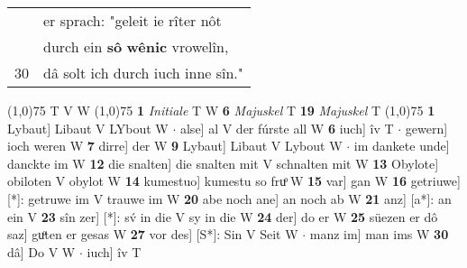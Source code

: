 \documentclass[8pt,a4paper,notitlepage]{article}
\begin{document}
\begin{table}[ht]
\begin{minipage}[t]{0.5\linewidth}
\begin{tabular}{rl}
 & er sprach: "geleit ie rîter nôt\\ 
 & durch ein \textbf{sô} \textbf{wênic} vrowelîn,\\ 
30 & dâ solt ich durch iuch inne sîn."\\ 
\end{tabular}
\scriptsize
\line(1,0){75} \newline
T V W \newline
\line(1,0){75} \newline
\textbf{1} \textit{Initiale} T W  \textbf{6} \textit{Majuskel} T  \textbf{19} \textit{Majuskel} T  \newline
\line(1,0){75} \newline
\textbf{1} Lybaut] Libaut V LYbout W  $\cdot$ alse] al V der fúrste all W \textbf{6} iuch] îv T  $\cdot$ gewern] ioch weren W \textbf{7} dirre] der W \textbf{9} Lybaut] Libaut V Lybout W  $\cdot$ im dankete unde] danckte im W \textbf{12} die snalten] die snalten mit V schnalten mit W \textbf{13} Obylote] obiloten V obylot W \textbf{14} kumestuo] kumestu so fruͦ W \textbf{15} var] gan W \textbf{16} getriuwe] [*]: getruwe im V trauwe im W \textbf{20} abe noch ane] an noch ab W \textbf{21} anz] [a*]: an ein V \textbf{23} sîn zer] [*]: sv́ in die V sy in die W \textbf{24} der] do er W \textbf{25} süezen er dô saz] guͦten er gesas W \textbf{27} vor des] [S*]: Sin V Seit W  $\cdot$ manz im] man ims W \textbf{30} dâ] Do V W  $\cdot$ iuch] îv T \newline
\end{minipage}
\end{table}
\end{document}

